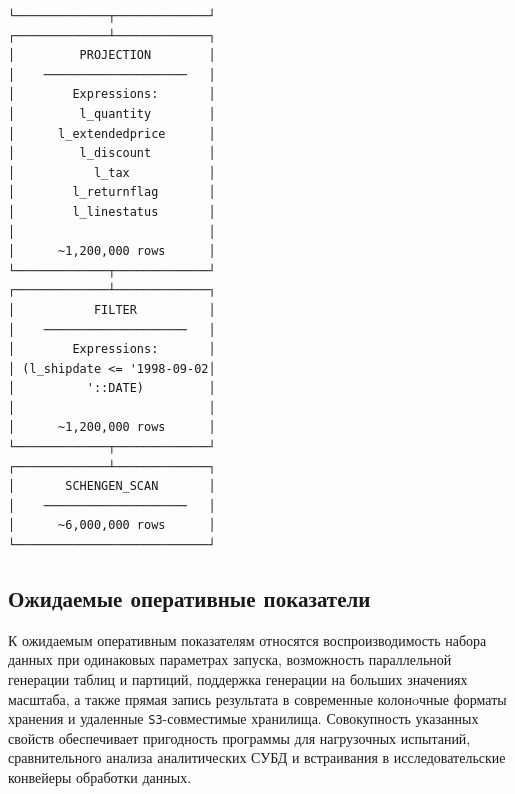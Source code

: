 \begin{lstlisting}[style=duckdbplanlisting,caption={Вывод DuckDB \texttt{EXPLAIN} для запроса \texttt{TPC-H Q1}}]
└─────────────┬─────────────┘
┌─────────────┴─────────────┐
│         PROJECTION        │
│    ────────────────────   │
│        Expressions:       │
│         l_quantity        │
│      l_extendedprice      │
│         l_discount        │
│           l_tax           │
│        l_returnflag       │
│        l_linestatus       │
│                           │
│      ~1,200,000 rows      │
└─────────────┬─────────────┘
┌─────────────┴─────────────┐
│           FILTER          │
│    ────────────────────   │
│        Expressions:       │
│ (l_shipdate <= '1998-09-02│
│          '::DATE)         │
│                           │
│      ~1,200,000 rows      │
└─────────────┬─────────────┘
┌─────────────┴─────────────┐
│       SCHENGEN_SCAN       │
│    ────────────────────   │
│      ~6,000,000 rows      │
└───────────────────────────┘
\end{lstlisting}

\subsection{Ожидаемые оперативные показатели}

К ожидаемым оперативным показателям относятся воспроизводимость набора данных
при одинаковых параметрах запуска, возможность параллельной генерации таблиц
и партиций, поддержка генерации на больших значениях масштаба, а также прямая
запись результата в современные колонoчные форматы хранения и удаленные
\texttt{S3}-совместимые хранилища. Совокупность указанных свойств обеспечивает
пригодность программы для нагрузочных испытаний, сравнительного анализа
аналитических СУБД  и встраивания в исследовательские конвейеры
обработки данных.
